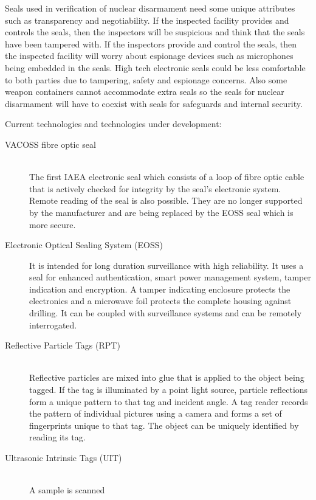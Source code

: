 \documentclass[twoside,titlepage,11pt,twocolumn,a4paper]{article}
\begin{document}
Seals used in verification of nuclear disarmament need some unique
attributes such as transparency and negotiability. If the inspected
facility provides and controls the seals, then the inspectors will be
suspicious and think that the seals have been tampered with. If the
inspectors provide and control the seals, then the inspected facility
will worry about espionage devices such as microphones being embedded
in the seals. High tech electronic seals could be less comfortable to
both parties due to tampering, safety and espionage concerns. Also
some weapon containers cannot accommodate extra seals so the seals for
nuclear disarmament will have to coexist with seals for safeguards and
internal security. \citep{nuclearTamperSeals2001}

Current technologies and technologies under development:
\citep{zarimpas2003}
\begin{description}
  \item[VACOSS fibre optic seal] \hfill \\ The first IAEA electronic
    seal which consists of a loop of fibre optic cable that is
    actively checked for integrity by the seal’s electronic
    system. Remote reading of the seal is also possible. They are no
    longer supported by the manufacturer and are being replaced by the
    EOSS seal which is more secure. \citep{IAEAsafeguards2011}
  \item[Electronic Optical Sealing System (EOSS)] It is intended for
    long duration surveillance with high reliability. It uses a seal
    for enhanced authentication, smart power management system, tamper
    indication and encryption. A tamper indicating enclosure protects
    the electronics and a microwave foil protects the complete housing
    against drilling. It can be coupled with surveillance systems and
    can be remotely interrogated. \citep{IAEAsafeguards2011}
  \item[Reflective Particle Tags (RPT)] \hfill \\ Reflective particles
    are mixed into glue that is applied to the object being tagged. If
    the tag is illuminated by a point light source, particle
    reflections form a unique pattern to that tag and incident
    angle. A tag reader records the pattern of individual pictures
    using a camera and forms a set of fingerprints unique to that
    tag. The object can be uniquely identified by reading its
    tag. \citep{ellis2007}
  \item[Ultrasonic Intrinsic Tags (UIT)] \hfill \\ A sample is scanned

\end{description}
\end{document}
